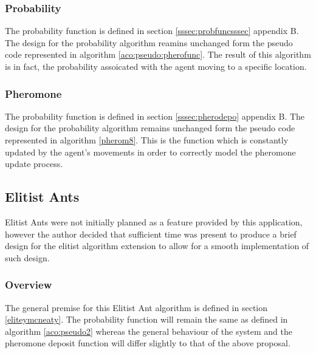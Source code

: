 \subsubsection{Probability}

The probability function is defined in section \ref{sssec:probfuncsssec} appendix B. The design for the probability algorithm reamins unchanged form the pseudo code represented in algorithm \ref{aco:pseudo:pherofunc}. The result of this algorithm is in fact, the probability assoicated with the agent moving to a specific location.

\subsubsection{Pheromone}

The probability function is defined in section \ref{sssec:pherodepo} appendix B. The design for the probability algorithm remains unchanged form the pseudo code represented in algorithm \ref{pherom8}. This is the function which is constantly updated by the agent’s movements in order to correctly model the pheromone update process.

\subsection{Elitist Ants}

Elitist Ants were not initially planned as a feature provided by this application, however the author decided that sufficient time was present to produce a brief design for the elitist algorithm extension to allow for a smooth implementation of such design.

\subsubsection{Overview}

The general premise for this Elitist Ant algorithm is defined in section \ref{eliteymcneaty}. The probability function will remain the same as defined in algorithm \ref{aco:pseudo2} whereas the general behaviour of the system and the pheromone deposit function will differ slightly to that of the above proposal.


